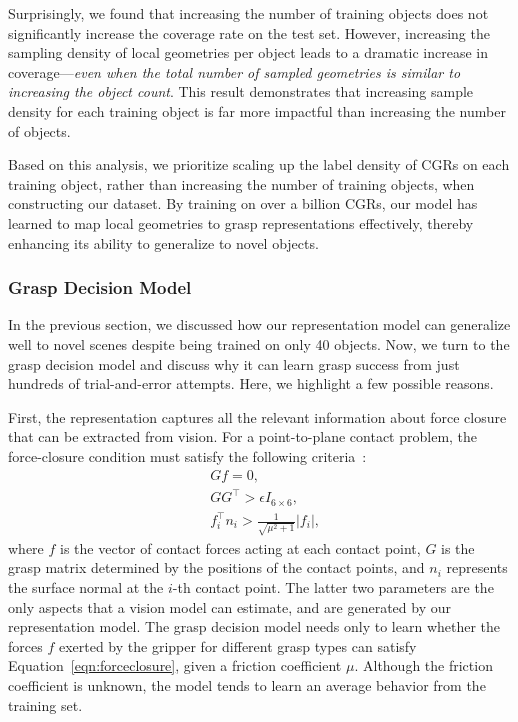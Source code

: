 Surprisingly, we found that increasing the number of training objects does not significantly increase the coverage rate on the test set. However, increasing the sampling density of local geometries per object leads to a dramatic increase in coverage—\textit{even when the total number of sampled geometries is similar to increasing the object count}. This result demonstrates that increasing sample density for each training object is far more impactful than increasing the number of objects.

Based on this analysis, we prioritize scaling up the label density of CGRs on each training object, rather than increasing the number of training objects, when constructing our dataset. By training on over a billion CGRs, our model has learned to map local geometries to grasp representations effectively, thereby enhancing its ability to generalize to novel objects.


\subsubsection*{Grasp Decision Model}
In the previous section, we discussed how our representation model can generalize well to novel scenes despite being trained on only 40 objects. Now, we turn to the grasp decision model and discuss why it can learn grasp success from just hundreds of trial-and-error attempts. Here, we highlight a few possible reasons.

First, the representation captures all the relevant information about force closure that can be extracted from vision. For a point-to-plane contact problem, the force-closure condition must satisfy the following criteria~\cite{dai2018synthesis}:
\begin{equation}
\begin{aligned}
     &Gf = 0, \\
     &GG^\top > \epsilon I_{6\times6},\\
     &f_i^\top n_i > \frac{1}{\sqrt{\mu^2+1}}|f_i|,
\label{eqn:forceclosure}
\end{aligned}
\end{equation}
where $f$ is the vector of contact forces acting at each contact point, $G$ is the grasp matrix determined by the positions of the contact points, and $n_i$ represents the surface normal at the $i$-th contact point. The latter two parameters are the only aspects that a vision model can estimate, and are generated by our representation model. The grasp decision model needs only to learn whether the forces $f$ exerted by the gripper for different grasp types can satisfy Equation~\eqref{eqn:forceclosure}, given a friction coefficient $\mu$. Although the friction coefficient is unknown, the model tends to learn an average behavior from the training set.

